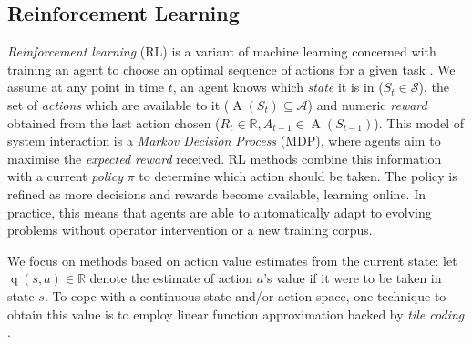 \documentclass[10pt, times, conference, letterpaper]{IEEEtran}
\begin{document}
\subsection{Reinforcement Learning}\label{sec:reinforcement-learning}
\emph{Reinforcement learning} (RL) is a variant of machine learning concerned with training an agent to choose an optimal sequence of actions for a given task \cite{RL2E}.
We assume at any point in time $t$, an agent knows which \emph{state} it is in ($S_t \in \mathcal{S}$), the set of \emph{actions} which are available to it ($\operatorname{A}(S_t) \subseteq \mathcal{A}$) and numeric \emph{reward} obtained from the last action chosen ($R_t \in \mathbb{R}, A_{t-1} \in \operatorname{A}(S_{t-1})$).
This model of system interaction is a \emph{Markov Decision Process} (MDP), where agents aim to maximise the \emph{expected reward} received.
RL methods combine this information with a current \emph{policy} $\pi$ to determine which action should be taken.
The policy is refined as more decisions and rewards become available, learning online.
In practice, this means that agents are able to automatically adapt to evolving problems without operator intervention or a new training corpus.

We focus on methods based on action value estimates from the current state: let $\operatorname{q}(s, a) \in \mathbb{R}$ denote the estimate of action $a$'s value if it were to be taken in state $s$.
To cope with a continuous state and/or action space, one technique to obtain this value is to employ linear function approximation backed by \emph{tile coding} \cite[pp.\ \numrange{217}{221}]{RL2E}.
\end{document}
